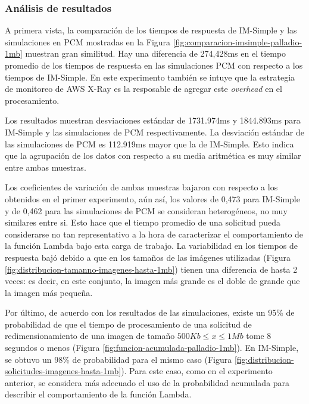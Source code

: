 \subsubsection{Análisis de resultados}
A primera vista, la comparación de los tiempos de respuesta de IM-Simple y las simulaciones en PCM mostradas en la Figura \ref{fig:comparacion-imsimple-palladio-1mb} muestran gran similitud. Hay una diferencia de 274,428ms en el tiempo promedio de los tiempos de respuesta en las simulaciones PCM con respecto a los tiempos de IM-Simple. En este experimento también se intuye que la estrategia de monitoreo de AWS X-Ray es la resposable de agregar este \emph{overhead} en el procesamiento.

Los resultados muestran desviaciones estándar de 1731.974ms y 1844.893ms para IM-Simple y las simulaciones de PCM respectivamente. La desviación estándar de las simulaciones de PCM es 112.919ms mayor que la de IM-Simple. Esto indica que la agrupación de los datos con respecto a su media aritmética es muy similar entre ambas muestras.

Los coeficientes de variación de ambas muestras bajaron con respecto a los obtenidos en el primer experimento, aún así, los valores de 0,473 para IM-Simple y de 0,462 para las simulaciones de PCM se consideran heterogéneos, no muy similares entre si. Esto hace que el tiempo promedio de una solicitud pueda considerarse no tan representativo a la hora de caracterizar el comportamiento de la función Lambda bajo esta carga de trabajo. La variabilidad en los tiempos de respuesta bajó debido a que en los tamaños de las imágenes utilizadas (Figura \ref{fig:distribucion-tamanno-imagenes-hasta-1mb}) tienen una diferencia de hasta 2 veces: es decir, en este conjunto, la imagen más grande es el doble de grande que la imagen más pequeña.

Por último, de acuerdo con los resultados de las simulaciones, existe un 95\% de probabilidad de que el tiempo de procesamiento de una solicitud de redimensionamiento de una imagen de tamaño $500Kb \leq x \leq 1Mb$ tome 8 segundos o menos (Figura \ref{fig:funcion-acumulada-palladio-1mb}). En IM-Simple, se obtuvo un 98\% de probabilidad para el mismo caso (Figura \ref{fig:distribucion-solicitudes-imagenes-hasta-1mb}). Para este caso, como en el experimento anterior, se considera más adecuado el uso de la probabilidad acumulada para describir el comportamiento de la función Lambda.


